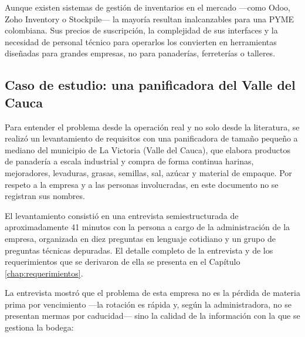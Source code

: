 Aunque existen sistemas de gestión de inventarios en el mercado —como Odoo, Zoho Inventory o Stockpile— la mayoría resultan inalcanzables para una PYME colombiana. Sus precios de suscripción, la complejidad de sus interfaces y la necesidad de personal técnico para operarlos los convierten en herramientas diseñadas para grandes empresas, no para panaderías, ferreterías o talleres.\cite{bbva2024mipymes}

\subsection{Caso de estudio: una panificadora del Valle del Cauca}

Para entender el problema desde la operación real y no solo desde la literatura, se realizó un levantamiento de requisitos con una panificadora de tamaño pequeño a mediano del municipio de La Victoria (Valle del Cauca), que elabora productos de panadería a escala industrial y compra de forma continua harinas, mejoradores, levaduras, grasas, semillas, sal, azúcar y material de empaque. Por respeto a la empresa y a las personas involucradas, en este documento no se registran sus nombres.

El levantamiento consistió en una entrevista semiestructurada de aproximadamente 41 minutos con la persona a cargo de la administración de la empresa, organizada en diez preguntas en lenguaje cotidiano y un grupo de preguntas técnicas depuradas. El detalle completo de la entrevista y de los requerimientos que se derivaron de ella se presenta en el Capítulo \ref{chap:requerimientos}.

La entrevista mostró que el problema de esta empresa no es la pérdida de materia prima por vencimiento ---la rotación es rápida y, según la administradora, no se presentan mermas por caducidad--- sino la calidad de la información con la que se gestiona la bodega:

